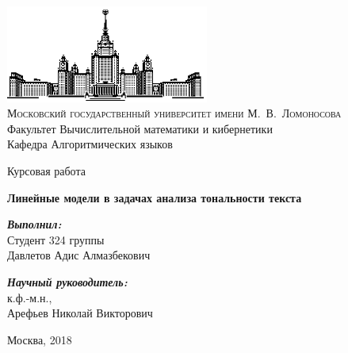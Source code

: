 \begin{titlepage}
\begin{center}
\ \vspace{-2.5cm}

\includegraphics[width=0.5\textwidth]{msu.eps}\\
{\scshape Московский государственный университет имени М.~В.~Ломоносова}\\
Факультет Вычислительной математики и кибернетики\\
Кафедра Алгоритмических языков
\vfill

\begin{LARGE}
	Курсовая работа
\end{LARGE}

\vspace{1cm}

\begin{Large}
\bfseries{Линейные модели в задачах анализа тональности текста}
\end{Large}

\vspace{1cm}


\end{center}

\vspace{1cm}

\begin{flushright}
  \large
  \textit{\bf Выполнил:}\\
  Студент 324 группы \\
  Давлетов Адис Алмазбекович
  
  \vspace{5mm}
  \textit{\bf Научный руководитель:}\\
  к.ф.-м.н., \\
  Арефьев Николай Викторович

\end{flushright}

\vfill

\begin{center}
Москва, 2018
\end{center}

\end{titlepage}
\setcounter{page}{2}
